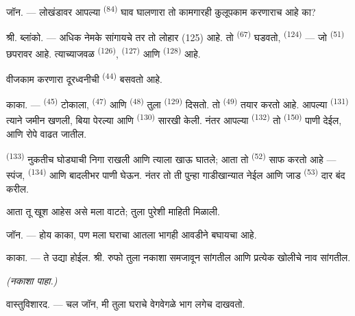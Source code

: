 \textsc{जॉन}. --- लोखंडावर आपल्या  \textsuperscript{(84)} घाव घालणारा तो
कामगारही कुलूपकाम करणाराच आहे का?

श्री. \textsc{ब्लांको}. --- अधिक नेमके सांगायचे तर तो लोहार (125) आहे. तो
 \textsuperscript{(67)} घडवतो, 
\textsuperscript{(124)} — जो  \textsuperscript{(51)} छपरावर आहे.
त्याच्याजवळ  \textsuperscript{(126)},  \textsuperscript{(127)} आणि
 \textsuperscript{(128)} आहे.

वीजकाम करणारा दूरध्वनीची  \textsuperscript{(44)}  बसवतो आहे.

\VUsaut{3.0mm}

\textsc{काका}. ---  \textsuperscript{(45)} टोकाला, 
\textsuperscript{(47)} आणि  \textsuperscript{(48)} तुला 
\textsuperscript{(129)} दिसतो. तो  \textsuperscript{(49)} तयार करतो आहे.
आपल्या  \textsuperscript{(131)} त्याने जमीन खणली, बिया पेरल्या आणि
 \textsuperscript{(130)} सारखी केली. नंतर आपल्या 
\textsuperscript{(132)} तो  \textsuperscript{(150)} पाणी देईल, आणि रोपे वाढत
जातील.

 \textsuperscript{(133)} नुकतीच घोड्याची निगा राखली आणि त्याला खाऊ घातले; आता तो  \textsuperscript{(52)} साफ करतो आहे — स्पंज,  \textsuperscript{(134)} आणि बादलीभर पाणी घेऊन. नंतर तो ती पुन्हा गाडीखान्यात नेईल आणि जाड  \textsuperscript{(53)} दार बंद करील.

आता तू खूश आहेस असे मला वाटते; तुला पुरेशी माहिती मिळाली.

\textsc{जॉन}. --- होय काका, पण मला घराचा आतला भागही आवडीने बघायचा आहे.

\textsc{काका}. --- ते उद्या होईल. श्री. रुफो तुला नकाशा समजावून सांगतील आणि प्रत्येक खोलीचे
नाव सांगतील.

\VUsaut{3.0mm}
\VUsaut{2.4mm}

{\centering\textit{(नकाशा पाहा.)}\par}
\VUsaut{2.4mm}

\textsc{वास्तुविशारद}. --- चल जॉन, मी तुला घराचे वेगवेगळे भाग लगेच दाखवतो.


